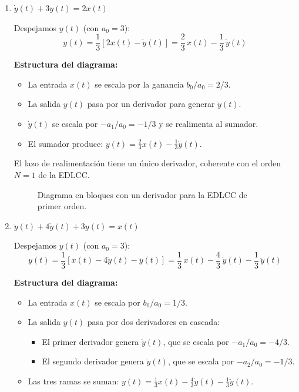 \documentclass[10pt,a4paper]{article}
\begin{document}
	\begin{enumerate}[label=\textbf{\alph*)}]
		\item $\dot{y}(t) + 3y(t) = 2x(t)$
		
		Despejamos $y(t)$ (con $a_0 = 3$):
		\[
		y(t) = \frac{1}{3}\left[2x(t) - \dot{y}(t)\right] = \frac{2}{3}\,x(t) - \frac{1}{3}\,\dot{y}(t)
		\]
		
		\textbf{Estructura del diagrama:}
		\begin{itemize}
			\item La entrada $x(t)$ se escala por la ganancia $b_0/a_0 = 2/3$.
			\item La salida $y(t)$ pasa por un derivador para generar $\dot{y}(t)$.
			\item $\dot{y}(t)$ se escala por $-a_1/a_0 = -1/3$ y se realimenta al sumador.
			\item El sumador produce: $y(t) = \frac{2}{3}x(t) - \frac{1}{3}\dot{y}(t)$.
		\end{itemize}
		
		El lazo de realimentación tiene un único derivador, coherente con el orden $N = 1$ de la EDLCC.
		
		\begin{figure}[H]
		\centering
		
		\caption{Diagrama en bloques con un derivador para la EDLCC de primer orden.}
		\end{figure}
		
		\item $\ddot{y}(t) + 4\dot{y}(t) + 3y(t) = x(t)$
		
		Despejamos $y(t)$ (con $a_0 = 3$):
		\[
		y(t) = \frac{1}{3}\left[x(t) - 4\dot{y}(t) - \ddot{y}(t)\right] = \frac{1}{3}\,x(t) - \frac{4}{3}\,\dot{y}(t) - \frac{1}{3}\,\ddot{y}(t)
		\]
		
		\textbf{Estructura del diagrama:}
		\begin{itemize}
			\item La entrada $x(t)$ se escala por $b_0/a_0 = 1/3$.
			\item La salida $y(t)$ pasa por dos derivadores en cascada:
			\begin{itemize}
				\item El primer derivador genera $\dot{y}(t)$, que se escala por $-a_1/a_0 = -4/3$.
				\item El segundo derivador genera $\ddot{y}(t)$, que se escala por $-a_2/a_0 = -1/3$.
			\end{itemize}
			\item Las tres ramas se suman: $y(t) = \frac{1}{3}x(t) - \frac{4}{3}\dot{y}(t) - \frac{1}{3}\ddot{y}(t)$.
		\end{itemize}
		

\end{enumerate}
\end{document}
